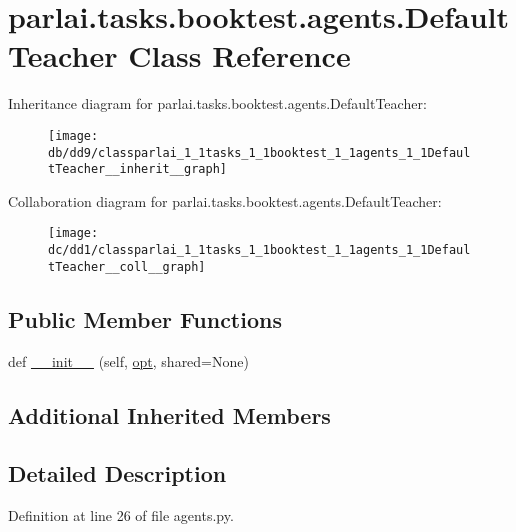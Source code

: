\hypertarget{classparlai_1_1tasks_1_1booktest_1_1agents_1_1DefaultTeacher}{}\section{parlai.\+tasks.\+booktest.\+agents.\+Default\+Teacher Class Reference}
\label{classparlai_1_1tasks_1_1booktest_1_1agents_1_1DefaultTeacher}


Inheritance diagram for parlai.\+tasks.\+booktest.\+agents.\+Default\+Teacher\+:\nopagebreak
\begin{figure}[H]
\begin{center}
\leavevmode
\texttt{[image: db/dd9/classparlai\_1\_1tasks\_1\_1booktest\_1\_1agents\_1\_1DefaultTeacher\_\_inherit\_\_graph]}
\end{center}
\end{figure}


Collaboration diagram for parlai.\+tasks.\+booktest.\+agents.\+Default\+Teacher\+:\nopagebreak
\begin{figure}[H]
\begin{center}
\leavevmode
\texttt{[image: dc/dd1/classparlai\_1\_1tasks\_1\_1booktest\_1\_1agents\_1\_1DefaultTeacher\_\_coll\_\_graph]}
\end{center}
\end{figure}
\subsection*{Public Member Functions}
\begin{DoxyCompactItemize}
\item 
def \hyperlink{classparlai_1_1tasks_1_1booktest_1_1agents_1_1DefaultTeacher_a22c8ec41b8b29da86546fe666a3016b0}{\+\_\+\+\_\+init\+\_\+\+\_\+} (self, \hyperlink{classparlai_1_1core_1_1teachers_1_1FbDialogTeacher_af7a9ec497b9cd0292d7b8fa220da7c28}{opt}, shared=None)
\end{DoxyCompactItemize}
\subsection*{Additional Inherited Members}


\subsection{Detailed Description}


Definition at line 26 of file agents.\+py.



